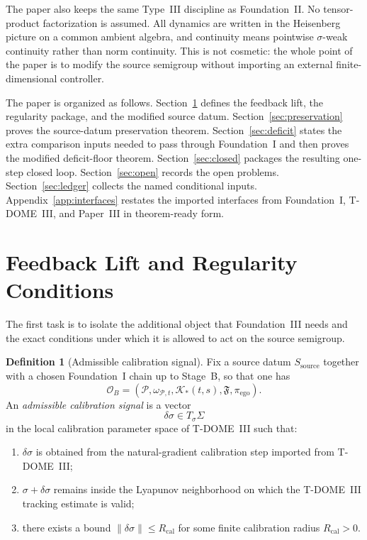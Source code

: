 \documentclass[12pt]{article}
\theoremstyle{definition}
\newtheorem{definition}[theorem]{Definition}
\theoremstyle{remark}
\begin{document}
The paper also keeps the same Type~III discipline as Foundation~II. No
tensor-product factorization is assumed. All dynamics are written in the
Heisenberg picture on a common ambient algebra, and continuity means
pointwise \(\sigma\)-weak continuity rather than norm continuity. This
is not cosmetic: the whole point of the paper is to modify the source
semigroup without importing an external finite-dimensional controller.

The paper is organized as follows. Section~\ref{sec:feedback} defines
the feedback lift, the regularity package, and the modified source
datum. Section~\ref{sec:preservation} proves the source-datum
preservation theorem. Section~\ref{sec:deficit} states the extra
comparison inputs needed to pass through Foundation~I and then proves
the modified deficit-floor theorem. Section~\ref{sec:closed} packages
the resulting one-step closed loop. Section~\ref{sec:open} records the
open problems. Section~\ref{sec:ledger} collects the named conditional
inputs. Appendix~\ref{app:interfaces} restates the imported interfaces
from Foundation~I, T-DOME~III, and Paper~III in theorem-ready form.

\section{Feedback Lift and Regularity Conditions}\label{sec:feedback}

The first task is to isolate the additional object that Foundation~III
needs and the exact conditions under which it is allowed to act on the
source semigroup.

\begin{definition}[Admissible calibration signal]\label{def:signal}
Fix a source datum \(S_{\mathrm{source}}\) together with a chosen
Foundation~I chain up to Stage~B, so that one has
\[
\mathcal O_B
=
(\mathcal P,\omega_{\mathcal P,t},\mathcal K_*(t,s),\mathfrak F,\pi_{\mathrm{ego}}).
\]
An \emph{admissible calibration signal} is a vector
\[
\delta\sigma \in T_\sigma\Sigma
\]
in the local calibration parameter space of T-DOME~III such that:
\begin{enumerate}
\item \(\delta\sigma\) is obtained from the natural-gradient calibration
  step imported from T-DOME~III;
\item \(\sigma+\delta\sigma\) remains inside the Lyapunov neighborhood on
  which the T-DOME~III tracking estimate is valid;
\item there exists a bound
  \(\|\delta\sigma\| \leq R_{\mathrm{cal}}\) for some finite
  calibration radius \(R_{\mathrm{cal}}>0\).
\end{enumerate}
\end{definition}
\end{document}
